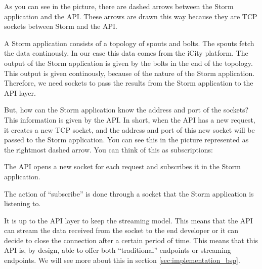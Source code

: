 As you can see in the picture, there are dashed arrows between the Storm
application and the API. These arrows are drawn this way because they are TCP
sockets between Storm and the API.

A Storm application consists of a topology of spouts and bolts. The spouts
fetch the data continously. In our case this data comes from the iCity
platform. The output of the Storm application is given by the bolts in the end
of the topology. This output is given continously, because of the nature of the
Storm application. Therefore, we need sockets to pass the results from the
Storm application to the API layer.

But, how can the Storm application know the address and port of the sockets?
This information is given by the API. In short, when the API has a new request,
it creates a new TCP socket, and the address and port of this new socket will
be passed to the Storm application. You can see this in the picture represented
as the rightmost dashed arrow. You can think of this as subscriptions:

\mylist
  \item The API opens a new socket for each request and subscribes it in the
Storm application.
  \item The action of ``subscribe'' is done through a socket that the Storm
application is listening to.
  \item It is up to the API layer to keep the streaming model. This means that
the API can stream the data received from the socket to the end developer or it
can decide to close the connection after a certain period of time. This means
that this API is, by design, able to offer both ``traditional'' endpoints or
streaming endpoints. We will see more about this in section
\ref{sec:implementation_bsp}.
\mylistend

